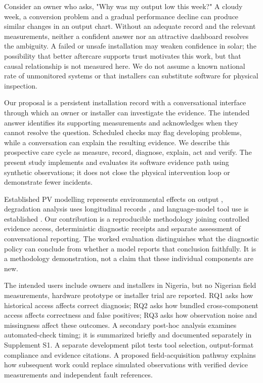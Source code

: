 \documentclass[11pt,a4paper]{article}
\begin{document}
Consider an owner who asks, "Why was my output low this week?" A cloudy week, a conversion problem and a gradual performance decline can produce similar changes in an output chart. Without an adequate record and the relevant measurements, neither a confident answer nor an attractive dashboard resolves the ambiguity. A failed or unsafe installation may weaken confidence in solar; the possibility that better aftercare supports trust motivates this work, but that causal relationship is not measured here. We do not assume a known national rate of unmonitored systems or that installers can substitute software for physical inspection.


Our proposal is a persistent installation record with a conversational interface through which an owner or installer can investigate the evidence. The intended answer identifies its supporting measurements and acknowledges when they cannot resolve the question. Scheduled checks may flag developing problems, while a conversation can explain the resulting evidence. We describe this prospective care cycle as measure, record, diagnose, explain, act and verify. The present study implements and evaluates its software evidence path using synthetic observations; it does not close the physical intervention loop or demonstrate fewer incidents.


Established PV modelling represents environmental effects on output \cite{king2004,holmgren2018}, degradation analysis uses longitudinal records \cite{jordan2018}, and language-model tool use is established \cite{yao2023,schick2023}. Our contribution is a reproducible methodology joining controlled evidence access, deterministic diagnostic receipts and separate assessment of conversational reporting. The worked evaluation distinguishes what the diagnostic policy can conclude from whether a model reports that conclusion faithfully. It is a methodology demonstration, not a claim that these individual components are new.


The intended users include owners and installers in Nigeria, but no Nigerian field measurements, hardware prototype or installer trial are reported. RQ1 asks how historical access affects correct diagnosis; RQ2 asks how bundled cross-component access affects correctness and false positives; RQ3 asks how observation noise and missingness affect these outcomes. A secondary post-hoc analysis examines automated-check timing; it is summarized briefly and documented separately in Supplement S1. A separate development pilot tests tool selection, output-format compliance and evidence citations. A proposed field-acquisition pathway explains how subsequent work could replace simulated observations with verified device measurements and independent fault references.
\end{document}
